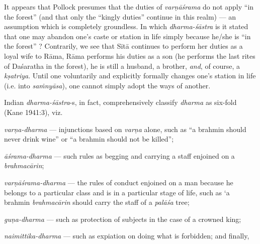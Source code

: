 It appears that Pollock presumes that the duties of {\sl varṇāśrama} do not apply “in the forest” (and that only the “kingly duties” continue in this realm) --- an assumption which is completely groundless. In which {\sl dharma-śāstra} is it stated that one may abandon one’s caste or station in life simply because he/she is “in the forest” ? Contrarily, we see that Sītā continues to perform her duties as a loyal wife to Rāma, Rāma performs his duties as a son (he performs the last rites of Daśaratha in the forest), he is still a husband, a brother, {\sl and}, of course, a {\sl kṣatriya}. Until one voluntarily and explicitly formally changes one’s station in life (i.e. into {\sl saṁnyāsa}), one cannot simply adopt the ways of another. 

Indian {\sl dharma-śāstra}-s, in fact, comprehensively classify {\sl dharma} as six-fold (Kane 1941:3), viz. 

{\sl varṇa-dharma}
 --- injunctions based on {\sl varṇa} alone, such as “a brahmin should never drink wine” or “a brahmin should not be killed”; 

{\sl āśrama-dharma}  --- such rules as begging and carrying a staff enjoined on a {\sl brahmacārin};
  
{\sl varṇāśrama-dharma} --- the rules of conduct enjoined on a man because he belongs to a particular class and is in a particular stage of life, such as ‘a brahmin {\sl brahmacārin} should carry the staff of a {\sl palāśa} tree; 

\newpage

{\sl guṇa-dharma} --- such as protection of subjects in the case of a crowned king; 

{\sl naimittika-dharma} --- such as expiation on doing what is forbidden; and finally, 

